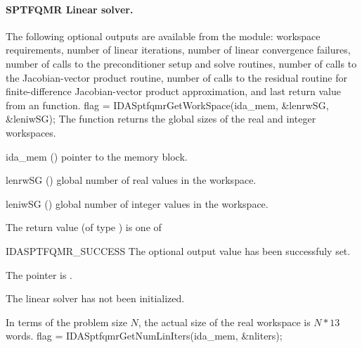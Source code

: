 %
%
\noindent\paragraph{\bf SPTFQMR Linear solver.}
The following optional outputs are available from the {\idasptfqmr} module:
workspace requirements, number of linear iterations,
number of linear convergence failures, number of calls to the preconditioner
setup and solve routines, number of calls to the Jacobian-vector product routine,
 number of calls to the residual routine for finite-difference  Jacobian-vector
 product approximation, and last return value from an {\idasptfqmr} function.
{
  flag = IDASptfqmrGetWorkSpace(ida\_mem, \&lenrwSG, \&leniwSG);
}
{
  The function  returns the global sizes of
  the {\idasptfqmr} real and integer workspaces.
}
{
  \begin{args}[lenrwSG]
  \item[ida\_mem] ()
    pointer to the {\ida} memory block.
  \item[lenrwSG] ()
    global number of real values in the {\idasptfqmr} workspace.
  \item[leniwSG] ()
    global number of integer values in the {\idasptfqmr} workspace.
  \end{args}
}
{
  The return value  (of type ) is one of
  \begin{args}
  \item[IDASPTFQMR\_SUCCESS] 
    The optional output value has been successfuly set.
  \item[\Id{IDASPTFQMR\_MEM\_NULL}]
    The  pointer is .
  \item[\Id{IDASPTFQMR\_LMEM\_NULL}]
    The {\idaspgmr} linear solver has not been initialized.
  \end{args}
}
{
  In terms of the problem size $N$, the actual size of the real workspace is
  $N*13$  words.
}
{
  flag = IDASptfqmrGetNumLinIters(ida\_mem, \&nliters);
}
